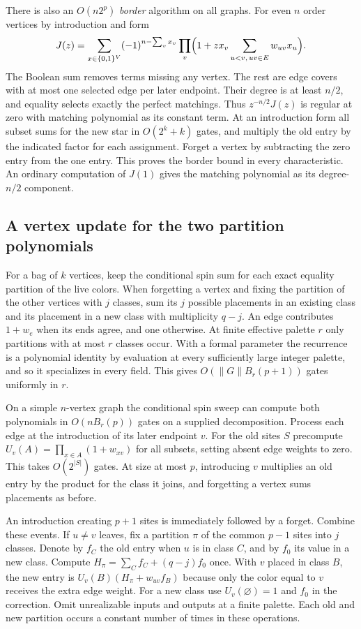 \documentclass[11pt]{article}
\theoremstyle{definition}
\newcommand{\bits}{\{0,1\}}
\begin{document}
There is also an \(O(n2^p)\) \emph{border} algorithm on all graphs. For even \(n\) order vertices by introduction and form
\[
 J(z)=\sum_{x\in\bits^V}(-1)^{n-\sum_v x_v}
       \prod_v\Bigl(1+z x_v\sum_{u<v,\,uv\in E}w_{uv}x_u\Bigr).
\]
The Boolean sum removes terms missing any vertex. The rest are edge covers with at most one selected edge per later endpoint. Their degree is at least \(n/2\), and equality selects exactly the perfect matchings. Thus \(z^{-n/2}J(z)\) is regular at zero with matching polynomial as its constant term. At an introduction form all subset sums for the new star in \(O(2^k+k)\) gates, and multiply the old entry by the indicated factor for each assignment. Forget a vertex by subtracting the zero entry from the one entry. This proves the border bound in every characteristic. An ordinary computation of \(J(1)\) gives the matching polynomial as its degree-\(n/2\) component.

\subsection{A vertex update for the two partition polynomials}

For a bag of \(k\) vertices, keep the conditional spin sum for each exact equality partition of the live colors. When forgetting a vertex and fixing the partition of the other vertices with \(j\) classes, sum its \(j\) possible placements in an existing class and its placement in a new class with multiplicity \(q-j\). An edge contributes \(1+w_e\) when its ends agree, and one otherwise. At finite effective palette \(r\) only partitions with at most \(r\) classes occur. With a formal parameter the recurrence is a polynomial identity by evaluation at every sufficiently large integer palette, and so it specializes in every field. This gives \(O(\|G\| B_r(p+1))\) gates uniformly in \(r\).

On a simple \(n\)-vertex graph the conditional spin sweep can compute both polynomials in \(O(n B_r(p))\) gates on a supplied decomposition. Process each edge at the introduction of its later endpoint \(v\). For the old sites \(S\) precompute \(U_v(A)=\prod_{x\in A}(1+w_{xv})\) for all subsets, setting absent edge weights to zero. This takes \(O(2^{|S|})\) gates. At size at most \(p\), introducing \(v\) multiplies an old entry by the product for the class it joins, and forgetting a vertex sums placements as before.

An introduction creating \(p+1\) sites is immediately followed by a forget. Combine these events. If \(u\ne v\) leaves, fix a partition \(\pi\) of the common \(p-1\) sites into \(j\) classes. Denote by \(f_C\) the old entry when \(u\) is in class \(C\), and by \(f_0\) its value in a new class. Compute \(H_\pi=\sum_C f_C+(q-j)f_0\) once. With \(v\) placed in class \(B\), the new entry is \(U_v(B)(H_\pi+w_{uv}f_B)\) because only the color equal to \(v\) receives the extra edge weight. For a new class use \(U_v(\varnothing)=1\) and \(f_0\) in the correction. Omit unrealizable inputs and outputs at a finite palette. Each old and new partition occurs a constant number of times in these operations.
\end{document}
